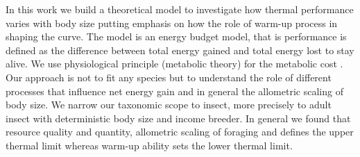  In this work we build a theoretical model to investigate how thermal performance varies with body size putting emphasis on how the role of warm-up process in shaping the curve. 
The model is an energy budget model, that is performance is defined as the difference between total energy gained and total energy lost to stay alive.
We use physiological principle (metabolic theory) for the metabolic cost \citep{Brown2004}.
Our approach is not to fit any species but to understand the role of different processes that influence net energy gain and in general the allometric scaling of body size.
We narrow our taxonomic scope to insect,  more precisely to adult insect with deterministic body size and income breeder. 
In general we found that resource quality and quantity, allometric scaling of foraging and defines the upper thermal limit whereas warm-up ability sets the lower thermal limit.
